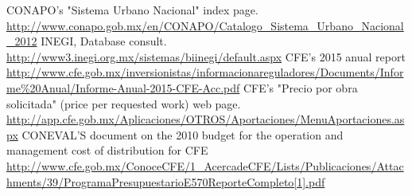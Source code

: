 \documentclass[•]{article}
\begin{document}
\begin{thebibliography}{9}

CONAPO's "Sistema Urbano Nacional" index page. \url{http://www.conapo.gob.mx/en/CONAPO/Catalogo_Sistema_Urbano_Nacional_2012}
INEGI, Database consult. \url{http://www3.inegi.org.mx/sistemas/biinegi/default.aspx}
CFE's 2015 anual report \url{http://www.cfe.gob.mx/inversionistas/informacionareguladores/Documents/Informe%20Anual/Informe-Anual-2015-CFE-Acc.pdf}
CFE's "Precio por obra solicitada" (price per requested work) web page. \url{http://app.cfe.gob.mx/Aplicaciones/OTROS/Aportaciones/MenuAportaciones.aspx}
CONEVAL'S document on the 2010 budget for the operation and management cost of distribution for CFE \url{http://www.cfe.gob.mx/ConoceCFE/1_AcercadeCFE/Lists/Publicaciones/Attachments/39/ProgramaPresupuestarioE570ReporteCompleto[1].pdf}
\end{thebibliography}
\end{document}
